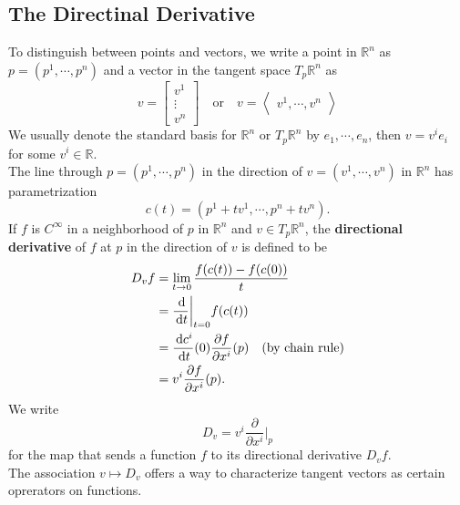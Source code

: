 \documentclass[en, oneside]{vivi}
\begin{document}
\subsection{The Directinal Derivative}
To distinguish between points and vectors, we write a point in $\mathbb{R}^n$ as $p = (p^1, \cdots, p^n)$ and a vector in the tangent space $T_p\mathbb{R}^n$ as
\begin{equation*}
    v = \begin{bmatrix*}
        v^1 \\
        \vdots \\
        v^n
    \end{bmatrix*}
    \quad \text{or} \quad v = \left\langle
        \begin{matrix}
        v^1, \cdots, v^n
        \end{matrix}
        \right\rangle
\end{equation*}
We usually denote the standard basis for $\mathbb{R}^n$ or $T_p\mathbb{R}^n$ by $e_1, \cdots, e_n$, then $v = v^i e_i$ for some $v^i \in \mathbb{R}$.\\
The line through $p = (p^1, \cdots, p^n)$ in the direction of $v = (v^1, \cdots, v^n)$ in $\mathbb{R}^n$ has parametrization
\begin{equation*}
    c(t) = (p^1 + tv^1, \cdots, p^n + tv^n).
\end{equation*}
If $f$ is $C^\infty$ in a neighborhood of $p$ in $\mathbb{R}^n$ and $v \in T_p\mathbb{R}^n$, the \textbf{directional derivative} of $f$ at $p$ in the direction of $v$ is defined to be
\begin{align*}
    D_v f &= \lim_{t \to 0} \frac{f(c(t)) - f(c(0))}{t}\\
    &= \frac{\dif}{\dif t} \bigg|_{t=0} f(c(t))\\
    &= \frac{\dif c^i}{\dif t}(0) \frac{\partial f}{\partial x^i}(p) \quad \text{(by chain rule)}\\
    &= v^i \frac{\partial f}{\partial x^i}(p).
\end{align*}
We write
\begin{equation*}
    D_v = v^i \frac{\partial}{\partial x^i} \bigg|_{p}
\end{equation*}
for the map that sends a function $f$ to its directional derivative $D_v f$.\\
The association $v \mapsto D_v$ offers a way to characterize tangent vectors as certain oprerators on functions.
\end{document}
